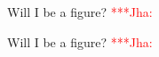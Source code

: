 \documentclass[a4paper,11pt]{article}
\newcommand{\jhanote}[1]{ {\textcolor{red} { ***Jha: #1 }}}
\newcommand{\jhanote}[1]{}
\begin{document}
\vspace{12pt}



\begin{figure}
\centering
\caption{Will I be a figure? \jhanote{}}
\end{figure}

\begin{figure}
\centering
\caption{Will I be a figure? \jhanote{}}
\end{figure}

\noindent 
\end{document}
